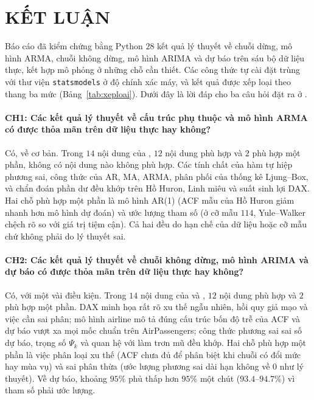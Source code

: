 \clearpage
\section[Kết luận]{KẾT LUẬN}

Báo cáo đã kiểm chứng bằng Python $28$ kết quả lý thuyết về chuỗi dừng, mô hình ARMA, chuỗi không dừng, mô hình ARIMA và dự báo trên sáu bộ dữ liệu thực, kết hợp mô phỏng ở những chỗ cần thiết. Các công thức tự cài đặt trùng với thư viện \texttt{statsmodels} ở độ chính xác máy, và kết quả được xếp loại theo thang ba mức (Bảng~\ref{tab:xeploai}). Dưới đây là lời đáp cho ba câu hỏi đặt ra ở .

\paragraph{CH1: Các kết quả lý thuyết về cấu trúc phụ thuộc và mô hình ARMA có được thỏa mãn trên dữ liệu thực hay không?}
Có, về cơ bản. Trong $14$ nội dung của , $12$ nội dung phù hợp và $2$ phù hợp một phần, không có nội dung nào không phù hợp. Các tính chất của hàm tự hiệp phương sai, công thức của AR, MA, ARMA, phân phối của thống kê Ljung--Box, và chẩn đoán phần dư đều khớp trên Hồ Huron, Linh miêu và suất sinh lợi DAX. Hai chỗ phù hợp một phần là mô hình AR(1) (ACF mẫu của Hồ Huron giảm nhanh hơn mô hình dự đoán) và ước lượng tham số (ở cỡ mẫu $114$, Yule--Walker chệch rõ so với giá trị tiệm cận). Cả hai đều do hạn chế của dữ liệu hoặc cỡ mẫu chứ không phải do lý thuyết sai.

\paragraph{CH2: Các kết quả lý thuyết về chuỗi không dừng, mô hình ARIMA và dự báo có được thỏa mãn trên dữ liệu thực hay không?}
Có, với một vài điều kiện. Trong $14$ nội dung của  và , $12$ nội dung phù hợp và $2$ phù hợp một phần. DAX minh họa rất rõ xu thế ngẫu nhiên, hồi quy giả mạo và việc cần sai phân; mô hình airline mô tả đúng cấu trúc bốn độ trễ của ACF và dự báo vượt xa mọi mốc chuẩn trên AirPassengers; công thức phương sai sai số dự báo, trọng số $\Psi_k$ và quan hệ với làm trơn mũ đều khớp. Hai chỗ phù hợp một phần là việc phân loại xu thế (ACF chưa đủ để phân biệt khi chuỗi có đổi mức hay mùa vụ) và sai phân thừa (ước lượng phương sai dài hạn không về $0$ như lý thuyết). Về dự báo, khoảng $95\%$ phủ thấp hơn $95\%$ một chút ($93.4$--$94.7\%$) vì tham số phải ước lượng.

